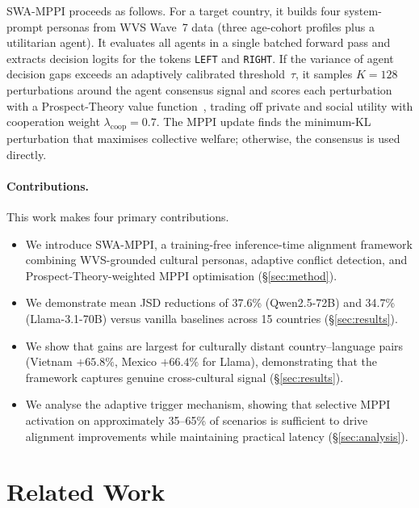\documentclass{article}
\begin{document}
SWA-MPPI proceeds as follows. For a target country, it builds four system-prompt
personas from WVS Wave~7 data (three age-cohort profiles plus a utilitarian agent).
It evaluates all agents in a single batched forward pass and extracts decision
logits for the tokens \texttt{LEFT} and \texttt{RIGHT}. If the variance of
agent decision gaps exceeds an adaptively calibrated threshold~$\tau$, it samples
$K = 128$ perturbations around the agent consensus signal and scores each perturbation
with a Prospect-Theory value function~\citep{kahneman1979prospect}, trading off
private and social utility with cooperation weight $\lambda_\text{coop} = 0.7$.
The MPPI update finds the minimum-KL perturbation that maximises collective welfare;
otherwise, the consensus is used directly.

\paragraph{Contributions.} This work makes four primary contributions.
\begin{itemize}
    \item We introduce SWA-MPPI, a training-free inference-time alignment framework
    combining WVS-grounded cultural personas, adaptive conflict detection, and
    Prospect-Theory-weighted MPPI optimisation (\S\ref{sec:method}).
    \item We demonstrate mean JSD reductions of 37.6\% (Qwen2.5-72B) and 34.7\%
    (Llama-3.1-70B) versus vanilla baselines across 15 countries
    (\S\ref{sec:results}).
    \item We show that gains are largest for culturally distant country--language
    pairs (Vietnam $+65.8\%$, Mexico $+66.4\%$ for Llama), demonstrating that
    the framework captures genuine cross-cultural signal (\S\ref{sec:results}).
    \item We analyse the adaptive trigger mechanism, showing that selective MPPI
    activation on approximately 35--65\% of scenarios is sufficient to drive
    alignment improvements while maintaining practical latency
    (\S\ref{sec:analysis}).
\end{itemize}

\section{Related Work}
\label{sec:related}
\end{document}
